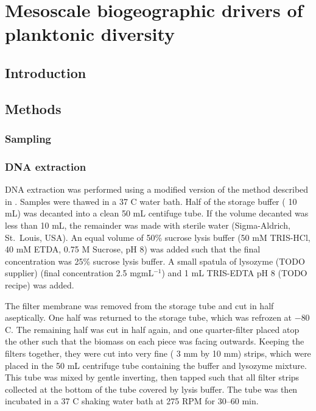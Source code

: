 \chapter{Mesoscale biogeographic drivers of planktonic diversity}
\label{ch:biogeog}

\section{Introduction}

\section{Methods}

\subsection{Sampling}

\subsection{DNA extraction}

DNA extraction was performed using a modified version of the method described in \citet{Rusch:2007ez}.
Samples were thawed in a 37 \textdegrees{}C water bath.
Half of the storage buffer (\textapprox{} 10 mL) was decanted into a clean 50 mL centifuge tube.
If the volume decanted was less than 10 mL, the remainder was made with sterile water (Sigma-Aldrich, St.\ Louis, USA).
An equal volume of 50\% sucrose lysis buffer (50 mM TRIS-HCl, 40 mM ETDA, 0.75 M Sucrose, pH 8) was added such that the final concentration was 25\% sucrose lysis buffer.
A small spatula of lysozyme (TODO supplier) (final concentration \textapprox{} 2.5 mgmL$^{-1}$) and 1 mL TRIS-EDTA pH 8 (TODO recipe) was added.

The filter membrane was removed from the storage tube and cut in half aseptically.
One half was returned to the storage tube, which was refrozen at $-80$ \textdegrees{}C.
The remaining half was cut in half again, and one quarter-filter placed atop the other such that the biomass on each piece was facing outwards.
Keeping the filters together, they were cut into very fine (\textapprox{} 3 mm by 10 mm) strips, which were placed in the 50 mL centrifuge tube containing the buffer and lysozyme mixture.
This tube was mixed by gentle inverting, then tapped such that all filter strips collected at the bottom of the tube covered by lysis buffer.
The tube was then incubated in a 37 \textdegree{}C shaking water bath at 275 RPM for 30--60 min.

